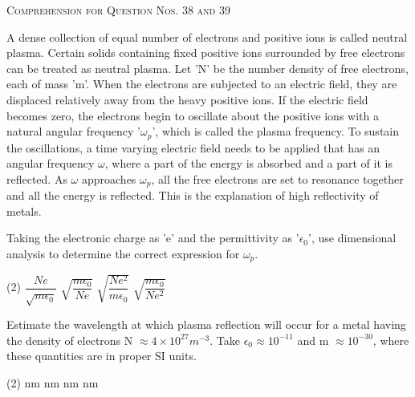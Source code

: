 \begin{center}
    \textsc{Comprehension for Question Nos. 38 and 39}
\end{center}

A dense collection of equal number of electrons and positive ions is called neutral plasma. Certain solids containing fixed positive ions surrounded by free electrons can be treated as neutral plasma. Let 'N' be the number density of free electrons, each of mass 'm'. When the electrons are subjected to an electric field, they are displaced relatively away from the heavy positive ions. If the electric field becomes zero, the electrons begin to oscillate about the positive ions with a natural angular frequency '$\omega_p$', which is called the plasma frequency. To sustain the oscillations, a time varying electric field needs to be applied that has an angular frequency $\omega$, where a part of the energy is absorbed and a part of it is reflected. As $\omega$ approaches $\omega_p$, all the free electrons are set to resonance together and all the energy is reflected. This is the explanation of high reflectivity of metals.

\item Taking the electronic charge as 'e' and the permittivity as '$\epsilon_0$', use dimensional analysis to determine the correct expression for $\omega_p$.
    \begin{tasks}(2)
        \task $\dfrac{Ne}{\sqrt{m\epsilon_0}}$
        \task $\sqrt{\dfrac{m\epsilon_0}{Ne}}$
        \task $\sqrt{\dfrac{Ne^2}{m\epsilon_0}}$\ans
        \task $\sqrt{\dfrac{m\epsilon_0}{Ne^2}}$
    \end{tasks}

\item Estimate the wavelength at which plasma reflection will occur for a metal having the density of electrons N $\approx 4 \times 10^{27} m^{-3}$. Take $\epsilon_0 \approx 10^{-11}$ and m $\approx 10^{-30}$, where these quantities are in proper SI units.
    \begin{tasks}(2)
         nm
         nm\ans
         nm
         nm
    \end{tasks}